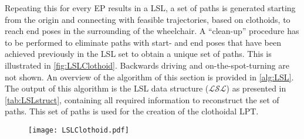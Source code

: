 Repeating this for every EP results in a LSL, a set of paths is generated starting from the origin and connecting with feasible trajectories, based on clothoids, to reach end poses in the surrounding of the wheelchair. A ``clean-up'' procedure has to be performed to eliminate paths with start- and end poses that have been achieved previously in the LSL set to obtain a unique set of paths. This is illustrated in \cref{fig:LSLClothoid}. Backwards driving and on-the-spot-turning are not shown. An overview of the algorithm of this section is provided in \cref{alg:LSL}. The output of this algorithm is the LSL data structure ($\mathcal{LSL}$) as presented in \cref{tab:LSLstruct}, containing all required information to reconstruct the set of paths. This set of paths is used for the creation of the clothoidal LPT.


\begin{figure}[!htbp]
	\centering
	\texttt{[image: LSLClothoid.pdf]}
\end{figure}

\newpage

